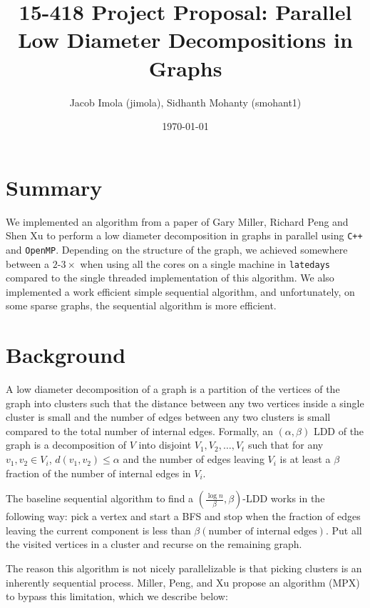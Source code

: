 \documentclass[11pt]{scrartcl}
\theoremstyle{plain}
\theoremstyle{definition}
\theoremstyle{remark}
\begin{document}
\title{15-418 Project Proposal: Parallel Low Diameter Decompositions in Graphs}
\author{\textsf{Jacob Imola (jimola), Sidhanth Mohanty (smohant1)}}
\date{\textsf{\today}}
\maketitle

\section{Summary}
We implemented an algorithm from a paper of Gary Miller, Richard Peng and Shen Xu \cite{miller2013parallel}
to perform a low diameter decomposition in graphs in parallel using \texttt{C++} and \texttt{OpenMP}.
Depending on the structure of the graph, we achieved somewhere between a $2$-$3\times$ when using all
the cores on a single machine in \texttt{latedays} compared to the single threaded implementation of
this algorithm. We also implemented a work efficient simple sequential algorithm, and unfortunately,
on some sparse graphs, the sequential algorithm is more efficient.

\section{Background}
A low diameter decomposition of a graph is a partition of the vertices of the graph into clusters such
that the distance between any two vertices inside a single cluster is small and the number of edges
between any two clusters is small compared to the total number of internal edges. Formally, an $(\alpha,
\beta)$ LDD of the graph is a decomposition of $V$ into disjoint $V_1,V_2,\ldots,V_t$ such that for
any $v_1,v_2\in V_i$, $d(v_1,v_2)\leq\alpha$ and the number of edges leaving $V_i$ is at least a
$\beta$ fraction of the number of internal edges in $V_i$.

The baseline sequential algorithm to find a $(\frac{\log n}{\beta},\beta)$-LDD works in the following way:
pick a vertex and start a BFS and stop when the fraction of edges leaving the current component is less
than $\beta(\text{number of internal edges})$. Put all the visited vertices in a cluster and recurse on the
remaining graph.

The reason this algorithm is not nicely parallelizable is that picking clusters is an inherently sequential process.
Miller, Peng, and Xu \cite{miller2013parallel} propose an algorithm (MPX) to bypass this limitation, which we describe below:
\end{document}
